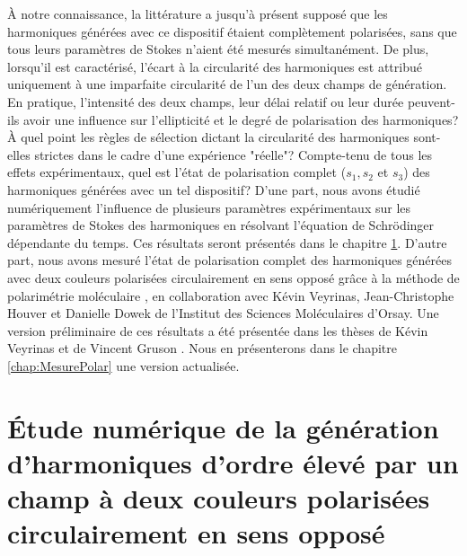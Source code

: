 \`{A} notre connaissance, la littérature a jusqu'à présent supposé que les harmoniques générées avec ce dispositif étaient complètement polarisées, sans que tous leurs paramètres de Stokes n'aient été mesurés simultanément. De plus, lorsqu'il est caractérisé, l'écart à la circularité des harmoniques est attribué uniquement à une imparfaite circularité de l'un des deux champs de génération. En pratique, l'intensité des deux champs, leur délai relatif ou leur durée peuvent-ils avoir une influence sur l'ellipticité et le degré de polarisation des harmoniques? \`{A} quel point les règles de sélection dictant la circularité des harmoniques sont-elles strictes dans le cadre d'une expérience "réelle"? Compte-tenu de tous les effets expérimentaux, quel est l'état de polarisation complet ($s_1, s_2$ et $s_3$) des harmoniques générées avec un tel dispositif? D'une part, nous avons étudié numériquement l'influence de plusieurs paramètres expérimentaux sur les paramètres de Stokes des harmoniques en résolvant l'équation de Schrödinger dépendante du temps. Ces résultats seront présentés dans le chapitre \ref{chap:calculsTA}. D'autre part, nous avons mesuré l'état de polarisation complet des harmoniques générées avec deux couleurs polarisées circulairement en sens opposé grâce à la méthode de polarimétrie moléculaire , en collaboration avec Kévin Veyrinas, Jean-Christophe Houver et Danielle Dowek de l'Institut des Sciences Moléculaires d'Orsay. Une version préliminaire de ces résultats a été présentée dans les thèses de Kévin Veyrinas  et de Vincent Gruson . Nous en présenterons dans le chapitre \ref{chap:MesurePolar} une version actualisée.

\chapter[Etude numérique de la GHOE par un champ à deux couleurs polarisées circulairement en sens opposé]{\'{E}tude numérique de la génération d'harmoniques d'ordre élevé par un champ à deux couleurs polarisées circulairement en sens opposé}
\label{chap:calculsTA}

